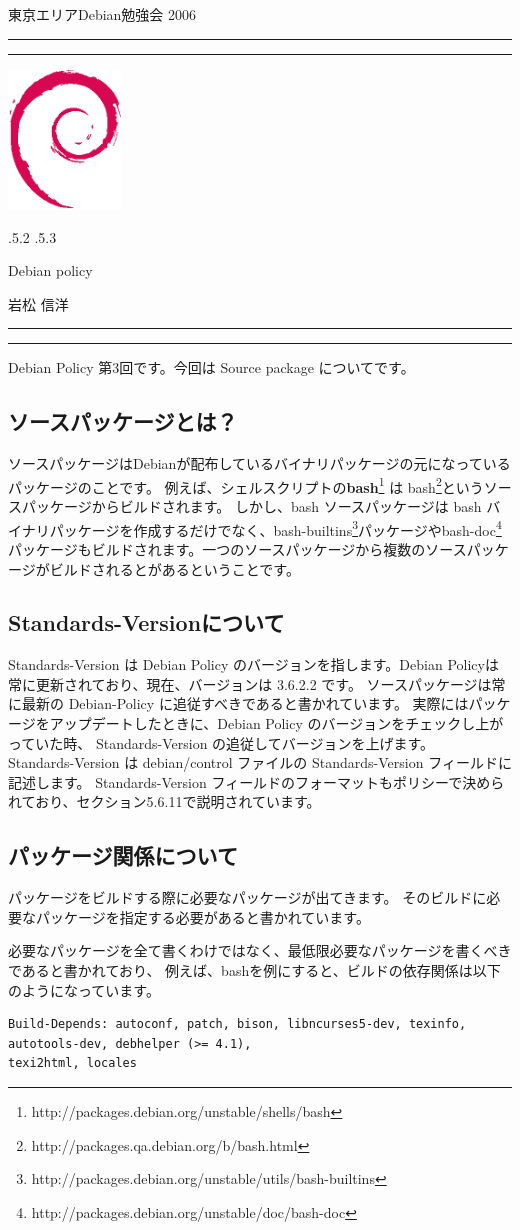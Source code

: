 \documentclass[mingoth,a4paper]{jsarticle}
\makeatletter
\renewcommand{\section}{\@startsection{section}{1}{\z@}%
    {\Cvs \@plus.5\Cdp \@minus.2\Cdp}%
    {.5\Cvs \@plus.3\Cdp}%
    {\normalfont\Large\headfont\raggedright\centering}} %
\newcommand{\dancersection}[2]{%
\newpage
東京エリアDebian勉強会 2006
\hrule
\vspace{0.5mm}
\hrule
\hfill{}\includegraphics[width=3cm]{image200502/openlogo-nd.eps}\\
\vspace{-4cm}
\begin{center}
  \section{#1}
\end{center}
\hfill{}#2\hspace{3cm}\space\\
\hrule
\hrule
\vspace{1cm}
}
\makeatother
\begin{document}
\dancersection{Debian policy}{岩松 信洋}
\label{sec:policy2}
Debian Policy 第3回です。今回は Source package についてです。
\subsection{ソースパッケージとは？}
ソースパッケージはDebianが配布しているバイナリパッケージの元になっているパッケージのことです。
例えば、シェルスクリプトの{\bf bash}\footnote{http://packages.debian.org/unstable/shells/bash} は bash\footnote{http://packages.qa.debian.org/b/bash.html}というソースパッケージからビルドされます。
しかし、bash ソースパッケージは bash バイナリパッケージを作成するだけでなく、bash-builtins\footnote{http://packages.debian.org/unstable/utils/bash-builtins}パッケージやbash-doc\footnote{http://packages.debian.org/unstable/doc/bash-doc}パッケージもビルドされます。一つのソースパッケージから複数のソースパッケージがビルドされるとがあるということです。

\subsection{Standards-Versionについて}
Standards-Version は Debian Policy のバージョンを指します。Debian Policyは常に更新されており、現在、バージョンは 3.6.2.2 です。
ソースパッケージは常に最新の Debian-Policy に追従すべきであると書かれています。
実際にはパッケージをアップデートしたときに、Debian Policy のバージョンをチェックし上がっていた時、 Standards-Version の追従してバージョンを上げます。
\\
Standards-Version は debian/control ファイルの Standards-Version フィールドに記述します。
Standards-Version フィールドのフォーマットもポリシーで決められており、セクション5.6.11で説明されています。

\subsection{パッケージ関係について}
パッケージをビルドする際に必要なパッケージが出てきます。
そのビルドに必要なパッケージを指定する必要があると書かれています。

必要なパッケージを全て書くわけではなく、最低限必要なパッケージを書くべきであると書かれており、
例えば、bashを例にすると、ビルドの依存関係は以下のようになっています。

\begin{verbatim} 
Build-Depends: autoconf, patch, bison, libncurses5-dev, texinfo, autotools-dev, debhelper (>= 4.1), 
texi2html, locales
\end{verbatim}
\end{document}
